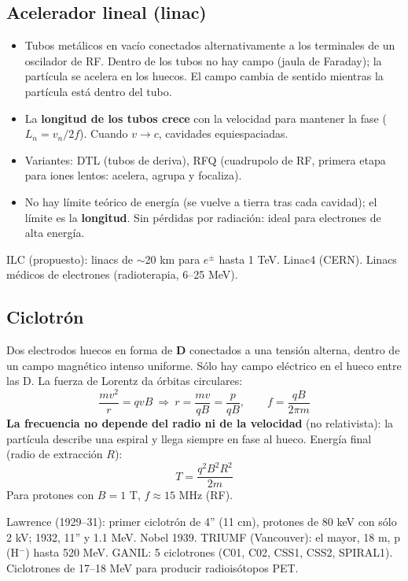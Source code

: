 \subsection{Acelerador lineal (linac)}
\begin{itemize}
\item Tubos metálicos en vacío conectados alternativamente a los terminales de un oscilador de RF. Dentro de los tubos no hay campo (jaula de Faraday);
la partícula se acelera en los huecos. El campo cambia de sentido mientras la partícula está dentro del tubo.
\item La \textbf{longitud de los tubos crece} con la velocidad para mantener la fase ($L_n=v_n/2f$). Cuando $v\to c$, cavidades equiespaciadas.
\item Variantes: DTL (tubos de deriva), RFQ (cuadrupolo de RF, primera etapa para iones lentos: acelera, agrupa y focaliza).
\item No hay límite teórico de energía (se vuelve a tierra tras cada cavidad); el límite es la \textbf{longitud}. Sin pérdidas por radiación: ideal para electrones de alta energía.
\end{itemize}
\begin{dato}
ILC (propuesto): linacs de $\sim$20 km para $e^\pm$ hasta 1 TeV. Linac4 (CERN). Linacs médicos de electrones (radioterapia, 6--25 MeV).
\end{dato}

\subsection{Ciclotrón}
\begin{clave}
Dos electrodos huecos en forma de \textbf{D} conectados a una tensión alterna, dentro de un campo magnético intenso uniforme. Sólo hay
campo eléctrico en el hueco entre las D. La fuerza de Lorentz da órbitas circulares:
\[ \frac{mv^2}{r}=qvB\ \Rightarrow\ r=\frac{mv}{qB}=\frac{p}{qB},\qquad f=\frac{qB}{2\pi m} \]
\textbf{La frecuencia no depende del radio ni de la velocidad} (no relativista): la partícula describe una espiral y llega siempre en fase al hueco.
Energía final (radio de extracción $R$):
\[ T=\frac{q^2B^2R^2}{2m} \]
Para protones con $B=1$ T, $f\approx15$ MHz (RF).
\end{clave}
\begin{dato}[Historia]
Lawrence (1929--31): primer ciclotrón de 4'' (11 cm), protones de 80 keV con sólo 2 kV; 1932, 11'' y 1.1 MeV. Nobel 1939.
TRIUMF (Vancouver): el mayor, 18 m, p (H$^-$) hasta 520 MeV. GANIL: 5 ciclotrones (C01, C02, CSS1, CSS2, SPIRAL1). Ciclotrones de 17--18 MeV para producir radioisótopos PET.
\end{dato}


